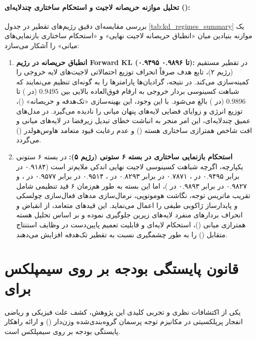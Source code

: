 \documentclass[12pt,a4paper]{report}
\theoremstyle{definition}
\begin{document}
\paragraph{تحلیل موازنه حریصانه لاجیت و استحکام ساختاری چندلایه‌ای ():}
بررسی مقایسه‌ای دقیق رژیم‌های تقطیر در جدول \ref{tab:kd_regimes_summary} یک موازنه بنیادین میان «انطباق حریصانه لاجیت نهایی» و «استحکام ساختاری بازنمایی‌های میانی» را آشکار می‌سازد:
\begin{enumerate}
    \item \textbf{انطباق حریصانه در رژیم Forward KL (۰.۹۴۹۵ تا ۰.۹۸۹۶):} 
    در تقطیر  مستقیم (رژیم ۲)، تابع هدف صرفاً انحراف توزیع احتمالاتی لاجیت‌های لایه خروجی را کمینه‌سازی می‌کند. در نتیجه، گرادیان‌ها پارامترها را به گونه‌ای تنظیم می‌نمایند که شباهت کسینوسی بردار خروجی به ارقام فوق‌العاده بالایی بین $0.9495$ (در ) تا $0.9896$ (در ) بالغ می‌شود. با این وجود، این بهینه‌سازی «تک‌هدفه و حریصانه» ()، توزیع انرژی و زوایای فضایی لایه‌های پنهان میانی را نادیده می‌گیرد. در مدل‌های عمیق چندلایه‌ای، این امر منجر به انباشت خطای تبدیل زیرفضا در لایه‌های میانی و افت شاخص همترازی ساختاری هسته () و عدم رعایت قیود متعامد هاوس‌هولدر () می‌گردد.
    \item \textbf{استحکام بازنمایی ساختاری در بسته ۶ ستونی (رژیم ۵):}
    در بسته ۶ ستونی یکپارچه، اگرچه شباهت کسینوسی لاجیت نهایی اندکی ملایم‌تر است (۰.۹۱۸۴ در برابر ۰.۹۴۹۵ در ، ۰.۷۸۷۱ در برابر ۰.۸۲۹۳ در ، ۰.۹۵۱۴ در برابر ۰.۹۵۷۷ در ، و ۰.۹۸۲۷ در برابر ۰.۹۸۹۳ در )، اما این بسته به طور هم‌زمان ۶ قید تنظیمی شامل تقریب ماتریس توجه، نگاشت هوموتوپی، نرمال‌سازی مدهای فعال‌سازی چولسکی و پایدارساز ژاکوبی طیفی را اعمال می‌نماید. این قیدهای متعامد، از انقباض و انحراف بردارهای منفرد لایه‌های زیرین جلوگیری نموده و بر اساس تحلیل هسته همترازی میانی ()، استحکام لایه‌ای و قابلیت تعمیم پایین‌دست در وظایف استنتاج متقابل () را به طور چشمگیری نسبت به تقطیر تک‌هدفه افزایش می‌دهند.
\end{enumerate}

\section{قانون پایستگی بودجه بر روی سیمپلکس برای }
\label{sec:simplex_conservation_law}
یکی از اکتشافات نظری و تجربی کلیدی این پژوهش، کشف علت فیزیکی و ریاضی انفجار پرپلکسیتی در مکانیزم توجه پرسمان گروه‌بندی‌شده وزن‌دار () و ارائه راهکار پایستگی بودجه بر روی سیمپلکس است.
\end{document}
